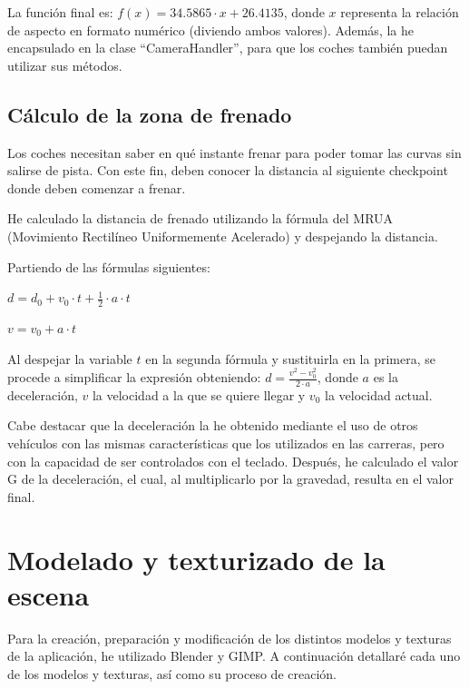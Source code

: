 \bigskip

La función final es: $f(x) = 34.5865 \cdot x + 26.4135$, donde $x$ representa la relación de aspecto en formato numérico (diviendo ambos valores). Además, la he encapsulado en la clase ``CameraHandler'', para que los coches también puedan utilizar sus métodos.

\subsection{Cálculo de la zona de frenado}

Los coches necesitan saber en qué instante frenar para poder tomar las curvas sin salirse de pista. Con este fin, deben conocer la distancia al siguiente checkpoint donde deben comenzar a frenar.

\bigskip

He calculado la distancia de frenado utilizando la fórmula del MRUA (Movimiento Rectilíneo Uniformemente Acelerado) y despejando la distancia.

\bigskip

Partiendo de las fórmulas siguientes: 

$d = d_0 + v_0 \cdot t + \frac{1}{2} \cdot a \cdot t$

$v = v_0 + a \cdot t$

\bigskip

Al despejar la variable $t$ en la segunda fórmula y sustituirla en la primera, se procede a simplificar la expresión obteniendo: $ d = \frac{v^2-v_0^2}{2 \cdot a} $, donde $a$ es la deceleración, $v$ la velocidad a la que se quiere llegar y $v_0$ la velocidad actual.

\bigskip

Cabe destacar que la deceleración la he obtenido mediante el uso de otros vehículos con las mismas características que los utilizados en las carreras, pero con la capacidad de ser controlados con el teclado. Después, he calculado el valor G de la deceleración, el cual, al multiplicarlo por la gravedad, resulta en el valor final.

\section{Modelado y texturizado de la escena}

Para la creación, preparación y modificación de los distintos modelos y texturas de la aplicación, he utilizado Blender\cite{blender} y GIMP\cite{gimp}. A continuación detallaré cada uno de los modelos y texturas, así como su proceso de creación.


